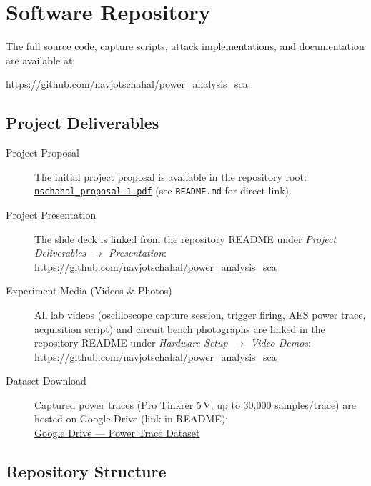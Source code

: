 \section{Software Repository}
\label{app:repo}

The full source code, capture scripts, attack implementations, and
documentation are available at:

\begin{center}
  \url{https://github.com/navjotschahal/power_analysis_sca}
\end{center}

\subsection*{Project Deliverables}

\begin{description}
  \item[Project Proposal]
    The initial project proposal is available in the repository root:\\
    \href{https://github.com/navjotschahal/power_analysis_sca/blob/main/nschahal_proposal-1.pdf}%
         {\texttt{nschahal\_proposal-1.pdf}}
    (see \texttt{README.md} for direct link).

  \item[Project Presentation]
    The slide deck is linked from the repository README under
    \emph{Project Deliverables $\to$ Presentation}:\\
    \url{https://github.com/navjotschahal/power_analysis_sca}

  \item[Experiment Media (Videos \& Photos)]
    All lab videos (oscilloscope capture session, trigger firing,
    AES power trace, acquisition script) and circuit bench photographs
    are linked in the repository README under
    \emph{Hardware Setup $\to$ Video Demos}:\\
    \url{https://github.com/navjotschahal/power_analysis_sca}

  \item[Dataset Download]
    Captured power traces (Pro Tinkrer 5\,V, up to 30{,}000 samples/trace)
    are hosted on Google Drive (link in README):\\
    \href{https://drive.google.com/file/d/1Itl82UCQEDyk6cYDD33kB-gKtlXIQBZe/view?usp=sharing}%
         {Google Drive --- Power Trace Dataset}
\end{description}

\subsection{Repository Structure}

